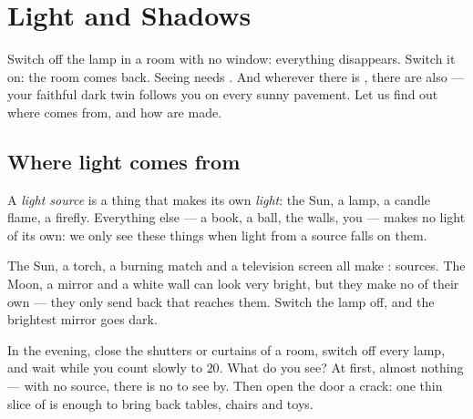 \chapter{Light and Shadows}\label{ch:g1:light-and-shadows}

Switch off the lamp in a room with no window: everything disappears.
Switch it on: the room comes back. Seeing needs . And wherever
there is , there are also  --- your faithful dark twin
follows you on every sunny pavement. Let us find out where 
comes from, and how  are made.

\section{Where light comes from}

\begin{definition}\label{def:g1:light-and-shadows:source}
A \emph{light source} is a thing that makes its
own \emph{light}: the Sun, a lamp, a candle flame, a
firefly. Everything else --- a book, a ball, the walls, you --- makes
no light of its own: we only see these things when light from a
source falls on them.
\end{definition}

\begin{example}\label{ex:g1:light-and-shadows:sources}
The Sun, a torch, a burning match and a television screen all make
: sources. The Moon, a mirror and a white wall can look very
bright, but they make no  of their own --- they only send back
 that reaches them. Switch the lamp off, and the brightest
mirror goes dark.
\end{example}

\begin{example}\label{ex:g1:light-and-shadows:darkroom}
In the evening, close the shutters or curtains of a room, switch off
every lamp, and wait while you count slowly to $20$. What do you see?
At first, almost nothing --- with no source, there is no  to see
by. Then open the door a crack: one thin slice of  is enough to
bring back tables, chairs and toys.
\end{example}

